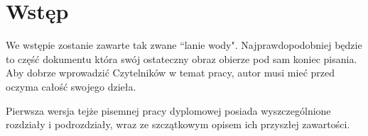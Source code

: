 \chapter*{Wstęp}

\thispagestyle{chapterBeginStyle}

{\color{dgray}
We wstępie zostanie zawarte tak zwane ``lanie wody". Najprawdopodobniej będzie to część dokumentu która swój ostateczny obraz obierze pod sam koniec pisania. Aby dobrze wprowadzić Czytelników w temat pracy, autor musi mieć przed oczyma całość swojego dzieła.

Pierwsza wersja tejże pisemnej pracy dyplomowej posiada wyszczególnione rozdziały i podrozdziały, wraz ze szczątkowym opisem ich przyszłej zawartości. 



}





